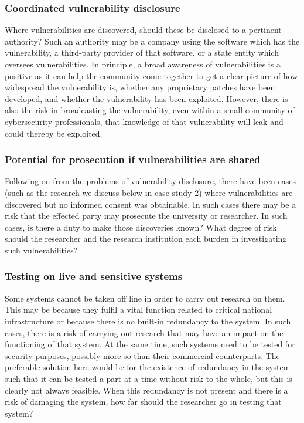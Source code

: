\documentclass{svjour3}                     %
\begin{document}
\subsubsection{Coordinated vulnerability disclosure}
Where vulnerabilities are discovered, should these be disclosed to a pertinent authority? Such an authority may be a company using the software which has the vulnerability, a third-party provider of that software, or a state entity which oversees vulnerabilities. In principle, a broad awareness of vulnerabilities is a positive as it can help the community come together to get a clear picture of how widespread the vulnerability is, whether any proprietary patches have been developed, and whether the vulnerability has been exploited. However, there is also the risk in broadcasting the vulnerability, even within a small community of cybersecurity professionals, that knowledge of that vulnerability will leak and could thereby be exploited.

\subsubsection{Potential for prosecution if vulnerabilities are shared}
Following on from the problems of vulnerability disclosure, there have been cases (such as the research we discuss below in case study 2) where vulnerabilities are discovered but no informed consent was obtainable. In such cases there may be a risk that the effected party may prosecute the university or researcher. In such cases, is there a duty to make those discoveries known? What degree of risk should the researcher and the research institution each burden in investigating such vulnerabilities?

\subsubsection{Testing on live and sensitive systems}
Some systems cannot be taken off line in order to carry out research on them. This may be because they fulfil a vital function related to critical national infrastructure or because there is no built-in redundancy to the system. In such cases, there is a risk of carrying out research that may have an impact on the functioning of that system. At the same time, such systems need to be tested for security purposes, possibly more so than their commercial counterparts. The preferable solution here would be for the existence of redundancy in the system such that it can be tested a part at a time without risk to the whole, but this is clearly not always feasible. When this redundancy is not present and there is a risk of damaging the system, how far should the researcher go in testing that system?
\end{document}
